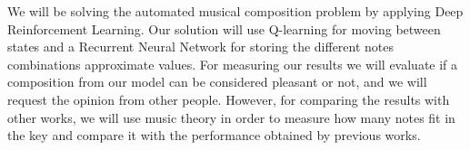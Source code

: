 We will be solving the automated musical composition problem by applying Deep Reinforcement Learning. Our solution will use Q-learning for moving between states and a Recurrent Neural Network for storing the different notes combinations approximate values. For measuring our results we will evaluate if a composition from our model can be considered pleasant or not, and we will request the opinion from other people. However, for comparing the results with other works, we will use music theory in order to measure how many notes fit in the key and compare it with the performance obtained by previous works.
